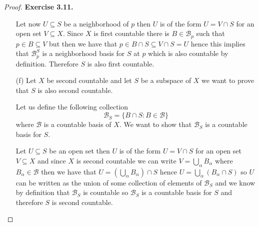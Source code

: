 \documentclass[11pt]{article}
\theoremstyle{definition}
\begin{document}
\begin{proof}{\textbf{Exercise 3.11.}}
\begin{itemize}
        Let now $U \subseteq S$ be a neighborhood of $p$ then $U$ is of the
        form $U = V \cap S$ for an open set $V \subseteq X$. Since $X$ is 
        first countable there is $B \in \mathcal{B}_p$ such that
        $p \in B \subseteq V$ but then we have that
        $p \in B \cap S \subseteq V \cap S = U$ hence this implies
        that $\mathcal{B}_p^S$ is a neighborhood basis for $S$ at $p$ which 
        is also countable by definition. Therefore $S$ is also first countable.
\cleardoublepage
        \item [(f)] Let $X$ be second countable and let $S$ be a subspace of
        $X$ we want to prove that $S$ is also second countable.

        Let us define the following collection
        $$\mathcal{B}_S = \{ B \cap S : B \in \mathcal{B}\}$$
        where $\mathcal{B}$ is a countable basis of $X$.
        We want to show that $\mathcal{B}_S$ is a countable basis for $S$.

        Let $U \subseteq S$ be an open set then $U$ is of the form
        $U = V \cap S$ for an open set $V \subseteq X$ and since $X$
        is second countable we can write $V = \bigcup_\alpha B_\alpha$ where
        $B_\alpha \in \mathcal{B}$ then we have that
        $U = (\bigcup_\alpha B_\alpha) \cap S$ hence
        $U = \bigcup_\alpha (B_\alpha \cap S)$ so $U$ can be written as
        the union of some collection of elements of $\mathcal{B}_S$
        and we know by definition that $\mathcal{B}_S$ is countable
        so $\mathcal{B}_S$ is a countable basis for $S$
        and therefore $S$ is second countable.
    \end{itemize}
\end{proof}
\end{document}

